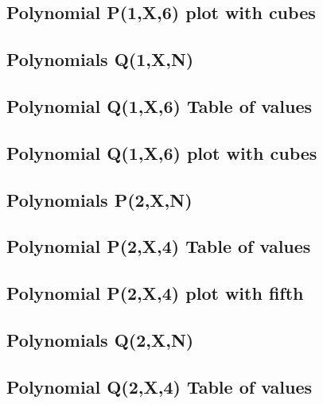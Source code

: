 \documentclass[12pt,letterpaper,oneside,reqno]{amsart}
\begin{document}
    \subsection{Polynomial P(1,X,6) plot with cubes}
    


    \subsection{Polynomials Q(1,X,N)}
    

    \subsection{Polynomial Q(1,X,6) Table of values}
    

    \subsection{Polynomial Q(1,X,6) plot with cubes}
    


    \subsection{Polynomials P(2,X,N)}
    

    \subsection{Polynomial P(2,X,4) Table of values}
    

    \subsection{Polynomial P(2,X,4) plot with fifth}
    


    \subsection{Polynomials Q(2,X,N)}
    

    \subsection{Polynomial Q(2,X,4) Table of values}
    
\end{document}
